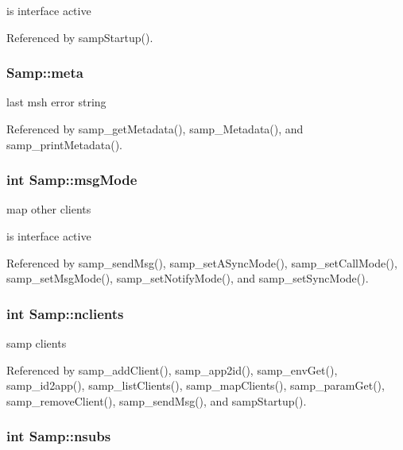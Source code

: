 is interface active 

Referenced by sampStartup().\hypertarget{structSamp_0884021074d1ed14342187005e0b78e7}{
\subsubsection[{meta}]{ {\bf Samp::meta}}}
\label{structSamp_0884021074d1ed14342187005e0b78e7}


last msh error string 

Referenced by samp\_\-getMetadata(), samp\_\-Metadata(), and samp\_\-printMetadata().\hypertarget{structSamp_30ca22535582e7bf6416627d1cd46525}{
\subsubsection[{msgMode}]{\setlength{\rightskip}{0pt plus 5cm}int {\bf Samp::msgMode}}}
\label{structSamp_30ca22535582e7bf6416627d1cd46525}


map other clients

is interface active 

Referenced by samp\_\-sendMsg(), samp\_\-setASyncMode(), samp\_\-setCallMode(), samp\_\-setMsgMode(), samp\_\-setNotifyMode(), and samp\_\-setSyncMode().\hypertarget{structSamp_97ef8ad57159f4b6c4fcd93a12853b69}{
\subsubsection[{nclients}]{\setlength{\rightskip}{0pt plus 5cm}int {\bf Samp::nclients}}}
\label{structSamp_97ef8ad57159f4b6c4fcd93a12853b69}


samp clients 

Referenced by samp\_\-addClient(), samp\_\-app2id(), samp\_\-envGet(), samp\_\-id2app(), samp\_\-listClients(), samp\_\-mapClients(), samp\_\-paramGet(), samp\_\-removeClient(), samp\_\-sendMsg(), and sampStartup().\hypertarget{structSamp_36f4cfae3407b8961e57a77abca7d599}{
\subsubsection[{nsubs}]{\setlength{\rightskip}{0pt plus 5cm}int {\bf Samp::nsubs}}}
\label{structSamp_36f4cfae3407b8961e57a77abca7d599}


